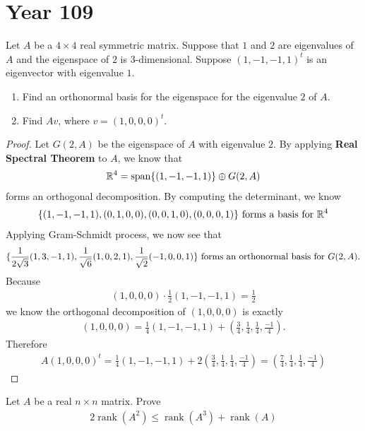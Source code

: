 \documentclass{report}
\begin{document}
\section{Year 109}
\begin{question}{}{}
Let $A$ be a  $4\times 4 $ real symmetric matrix. Suppose that $1$ and $2$ are eigenvalues of $A$ and the eigenspace of  $2$ is  $3$-dimensional. Suppose  $(1,-1,-1,1)^t$ is an eigenvector with eigenvalue $1$. 
 \begin{enumerate}[label=(\alph*)]
  \item Find an orthonormal basis for the eigenspace for the eigenvalue $2$ of $A$.  
  \item Find $Av$, where  $v=(1,0,0,0)^t$. 
\end{enumerate}
\end{question}
\begin{proof}
Let $G(2,A)$ be the eigenspace of $A$ with eigenvalue  $2$. By applying \textbf{Real Spectral Theorem} to $A$, we know that  
 \begin{align*}
   \mathbb{R}^4=\operatorname{span}\{ (1,-1,-1,1) \} \oplus G(2,A)
\end{align*}
forms an orthogonal decomposition. By computing the determinant, we know 
\begin{align*}
\{ (1,-1,-1,1),(0,1,0,0),(0,0,1,0),(0,0,0,1) \}\text{ forms a basis for }\mathbb{R}^4
\end{align*}
Applying Gram-Schmidt process, we now see that 
\begin{align*}
  \{ \frac{1}{2\sqrt{3}}(1,3,-1,1),\frac{1}{\sqrt{6}}(1,0,2,1),\frac{1}{\sqrt{2}}(-1,0,0,1) \}\text{ forms an orthonormal basis for }G(2,A). 
\end{align*}
Because 
\begin{align*}
  (1,0,0,0) \cdot \frac{1}{2}(1,-1,-1,1)= \frac{1}{2}
\end{align*}
we know the orthogonal decomposition of $(1,0,0,0)$ is exactly 
\begin{align*}
  (1,0,0,0)= \frac{1}{4}(1,-1,-1,1)+ (\frac{3}{4},\frac{1}{4},\frac{1}{4},\frac{-1}{4}). 
\end{align*}
Therefore 
\begin{align*}
A(1,0,0,0)^t= \frac{1}{4}(1,-1,-1,1)+ 2(\frac{3}{4},\frac{1}{4},\frac{1}{4},\frac{-1}{4})= (\frac{7}{4},\frac{1}{4},\frac{1}{4}, \frac{-1}{4})
\end{align*}
\end{proof}
\begin{question}{}{}
Let $A$ be a real  $n\times n$ matrix. Prove 
\begin{align*}
2\operatorname{rank}(A^2)\leq \operatorname{rank}(A^3)+\operatorname{rank}(A)
\end{align*}
\end{question}
\end{document}
